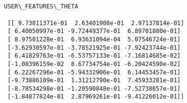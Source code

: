 \documentclass[11pt]{article}
\begin{document}
    \begin{center}
    \end{center}
    { \hspace*{\fill} \\}
    
    \begin{Verbatim}[commandchars=\\\{\}]

USER\_FEATURES\_THETA 

 [[ 9.73811371e-01  2.63401908e-01  2.97137814e-01]
 [ 6.40050997e-01 -9.72449377e-01  6.89701880e-01]
 [ 8.97501228e-01  6.93631094e-04  5.07546724e-01]
 [-3.62930597e-01 -3.78521925e-01 -7.92423744e-01]
 [ 6.41829763e-01 -6.53757133e-01 -7.16814685e-02]
 [-1.08396159e-02  8.67734754e-01 -6.20424590e-02]
 [ 6.22267296e-01 -5.94332906e-01  6.14453457e-01]
 [-9.73886109e-01  1.31212790e-01  7.45933281e-01]
 [-8.78534298e-01 -1.20590848e-01 -7.52738657e-01]
 [-1.84877824e-01  2.87969261e-01 -9.41226012e-01]]

    \end{Verbatim}

    \begin{center}
    \end{center}
    { \hspace*{\fill} \\}
    
\end{document}

